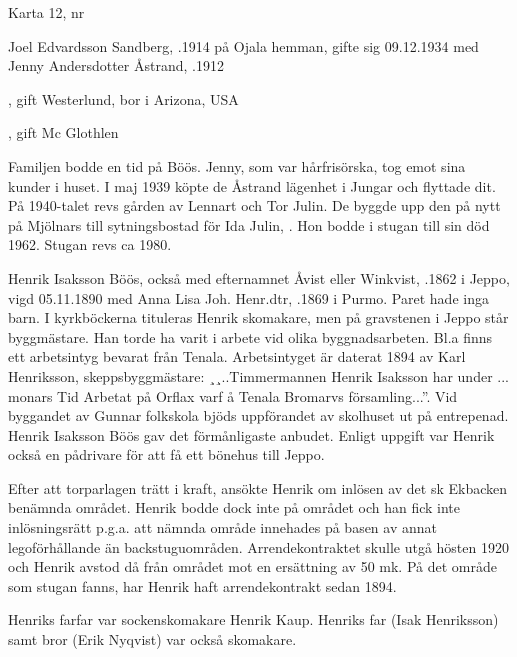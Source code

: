 Karta 12,   nr 

%
Joel Edvardsson Sandberg, .1914 på Ojala hemman, gifte sig 09.12.1934 med Jenny Andersdotter Åstrand, .1912
\begin{jhchildren}
  \item {}, gift Westerlund, bor i Arizona, USA
  \item {}, gift Mc Glothlen
\end{jhchildren}
Familjen bodde en tid på Böös. Jenny, som var hårfrisörska, tog emot sina kunder i huset. I maj 1939 köpte de Åstrand lägenhet i Jungar och flyttade dit. På 1940-talet revs gården av Lennart och Tor Julin. De byggde upp den på nytt på Mjölnars till sytningsbostad för Ida Julin, . Hon bodde i stugan till sin död 1962. Stugan revs ca 1980.


%
Henrik Isaksson Böös, också med efternamnet Åvist eller Winkvist, .1862 i Jeppo, vigd 05.11.1890 med Anna Lisa Joh. Henr.dtr, .1869 i Purmo. Paret hade inga barn. I kyrkböckerna tituleras Henrik skomakare, men på gravstenen i Jeppo står byggmästare. Han torde ha varit i arbete vid olika byggnadsarbeten. Bl.a finns ett arbetsintyg bevarat från Tenala. Arbetsintyget är daterat 1894 av Karl Henriksson, skeppsbyggmästare: ¸¸..Timmermannen Henrik Isaksson har under ... monars Tid Arbetat på Orflax varf å Tenala Bromarvs församling...''. Vid byggandet av Gunnar folkskola bjöds uppförandet av skolhuset ut på entrepenad. Henrik Isaksson Böös gav det förmånligaste anbudet. Enligt uppgift var Henrik också en pådrivare för att få ett bönehus till Jeppo.

Efter att torparlagen trätt i kraft, ansökte Henrik om inlösen av det sk Ekbacken benämnda området. Henrik bodde dock inte på området och han fick inte inlösningsrätt p.g.a. att nämnda område innehades på basen av annat legoförhållande än backstuguområden. Arrendekontraktet skulle utgå hösten 1920 och Henrik avstod då från området mot en ersättning av 50 mk. På det område som stugan fanns, har Henrik haft arrendekontrakt sedan 1894.

Henriks farfar var sockenskomakare Henrik Kaup. Henriks far (Isak Henriksson) samt bror (Erik Nyqvist) var också skomakare.

